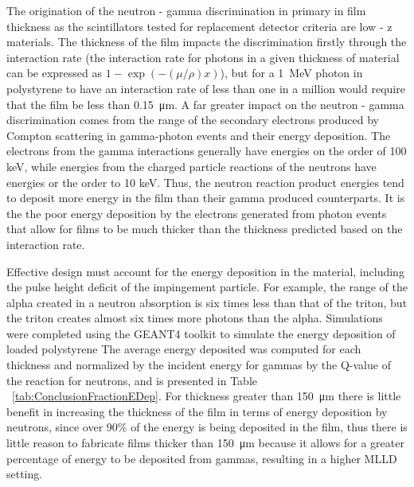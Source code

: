 The origination of the neutron - gamma discrimination in primary in film thickness as the scintillators tested for replacement detector criteria are low - z materials.
The thickness of the film impacts the discrimination firstly through the interaction rate (the interaction rate for photons in a given thickness of material can be expressed as $1-\exp\left(-(\mu/\rho)x \right )$), but for a \SI{1}{\MeV} photon in polystyrene to have an interaction rate of less than one in a million would require that the film be less than \SI{0.15}{\um}.
A far greater impact on the neutron - gamma discrimination comes from the range of the secondary electrons produced by Compton scattering in gamma-photon events and their energy deposition.
The electrons from the gamma interactions generally have energies on the order of 100 keV, while energies from the charged particle reactions of the neutrons have energies or the order to 10 keV.
Thus, the neutron reaction product energies tend to deposit more energy in the film than their gamma produced counterparts.
It is the the poor energy deposition by the electrons generated from photon events that allow for films to be much thicker than the thickness predicted based on the interaction rate.

Effective design must account for the energy deposition in the material, including the pulse height deficit of the impingement particle.
For example, the range of the alpha created in a  neutron absorption is six times less than that of the triton, but the triton creates almost six times more photons than the alpha.
Simulations were completed using the GEANT4 toolkit to simulate the energy deposition of  loaded polystyrene
The average energy deposited was computed for each thickness and normalized by the incident energy for gammas by the Q-value of the reaction for neutrons, and is presented in Table ~\ref{tab:ConclusionFractionEDep}.
For thickness greater than \SI{150}{\um} there is little benefit in increasing the thickness of the film in terms of energy deposition by neutrons, since over 90\% of the energy is being deposited in the film, thus there is little reason to fabricate films thicker than \SI{150}{\um} because it allows for a greater percentage of energy to be deposited from gammas, resulting in a higher MLLD setting.

